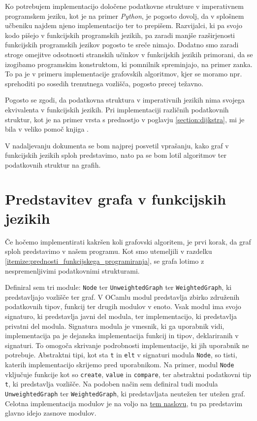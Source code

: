 \documentclass[mat1, tisk]{fmfdelo}
\begin{document}
Ko potrebujem implementacijo določene podatkovne strukture v imperativnem programskem jeziku, kot je na primer
\textit{Python}, je pogosto dovolj, da v splošnem učbeniku najdem njeno implementacijo ter to prepišem.
Razvijalci, ki pa svojo kodo pišejo v funkcijskih programskih jezikih, pa zaradi manjše
razširjenosti funkcijskih programskih jezikov pogosto te sreče nimajo.
Dodatno smo zaradi stroge omejitve odsotnosti stranskih učinkov v funkcijskih jezikih primorani, da se izogibamo
programskim konstruktom, ki pomnilnik spreminjajo, na primer zanka. To pa je v primeru implementacije grafovskih
algoritmov, kjer se moramo npr. sprehoditi po sosedih trenutnega vozlišča, pogosto precej težavno.

Pogosto se zgodi, da podatkovna struktura v imperativnih jezikih nima svojega ekvivalenta v funkcijskih jezikih.
Pri implementaciji različnih podatkovnih struktur, kot je na primer vrsta s prednostjo v poglavju
\ref{section:dijkstra}, mi je bila v veliko pomoč knjiga \cite{okasaki1996}.

V nadaljevanju dokumenta se bom najprej posvetil vprašanju, kako graf v funkcijskih jezikih sploh predstavimo, 
nato pa se bom lotil algoritmov ter podatkovnih struktur na grafih.

\section{Predstavitev grafa v funkcijskih jezikih}

Če hočemo implementirati kakršen koli grafovski algoritem, je prvi korak, da graf sploh predstavimo v našem programu.
Kot smo utemeljili v razdelku \ref{itemize:prednosti_funkcijskega_programiranja}, se grafa lotimo z nespremenljivimi
podatkovnimi strukturami.

Definiral sem tri module: \texttt{Node} ter \texttt{UnweightedGraph} ter \texttt{WeightedGraph}, ki predstavljajo
vozlišče ter graf. V OCamlu modul predstavlja zbirko združenih podatkovnih tipov, funkcij ter drugih modulov v enoto.
Vsak modul ima svojo signaturo, ki predstavlja javni del modula, ter implementacijo, ki predstavlja privatni del modula.
Signatura modula je vmesnik, ki ga uporabnik vidi, implementacija pa je dejanska implementacija funkcij in tipov,
deklariranih v signaturi. To omogoča skrivanje podrobnosti implementacije, ki jih uporabnik ne potrebuje. Abstraktni tipi, kot sta
\texttt{t} in \texttt{elt} v signaturi modula \texttt{Node}, so tisti, katerih implementacijo skrijemo pred uporabnikom.
Na primer, modul \texttt{Node} vključuje funkcije kot so \texttt{create}, \texttt{value} in \texttt{compare}, ter abstraktni
podatkovni tip \texttt{t}, ki predstavlja vozlišče. Na podoben način sem definiral tudi modula \texttt{UnweightedGraph}
ter \texttt{WeightedGraph}, ki predstavljata neutežen ter utežen graf.
Celotna implementacija modulov je na voljo na \href{https://github.com/tjazerzen/parallelisation-of-graph-algorithms-in-functional-programming-languages/blob/master/playground/graph/graph.ml}{tem naslovu},
tu pa predstavim glavno idejo zasnove modulov.
\end{document}

